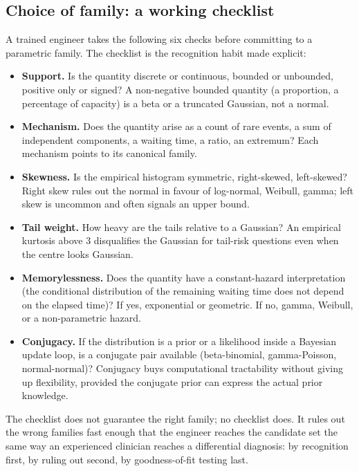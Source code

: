 

\subsection{Choice of family: a working checklist}

A trained engineer takes the following six checks before committing
to a parametric family. The checklist is the recognition habit made
explicit:

\begin{itemize}[leftmargin=*]
  \item \textbf{Support.} Is the quantity discrete or continuous,
    bounded or unbounded, positive only or signed? A non-negative
    bounded quantity (a proportion, a percentage of capacity) is a
    beta or a truncated Gaussian, not a normal.
  \item \textbf{Mechanism.} Does the quantity arise as a count of
    rare events, a sum of independent components, a waiting time, a
    ratio, an extremum? Each mechanism points to its canonical
    family.
  \item \textbf{Skewness.} Is the empirical histogram symmetric,
    right-skewed, left-skewed? Right skew rules out the normal in
    favour of log-normal, Weibull, gamma; left skew is uncommon and
    often signals an upper bound.
  \item \textbf{Tail weight.} How heavy are the tails relative to a
    Gaussian? An empirical kurtosis above $3$ disqualifies the
    Gaussian for tail-risk questions even when the centre looks
    Gaussian.
  \item \textbf{Memorylessness.} Does the quantity have a
    constant-hazard interpretation (the conditional distribution of
    the remaining waiting time does not depend on the elapsed time)?
    If yes, exponential or geometric. If no, gamma, Weibull, or a
    non-parametric hazard.
  \item \textbf{Conjugacy.} If the distribution is a prior or a
    likelihood inside a Bayesian update loop, is a conjugate pair
    available (beta-binomial, gamma-Poisson, normal-normal)?
    Conjugacy buys computational tractability without giving up
    flexibility, provided the conjugate prior can express the actual
    prior knowledge.
\end{itemize}

The checklist does not guarantee the right family; no checklist does.
It rules out the wrong families fast enough that the engineer reaches
the candidate set the same way an experienced clinician reaches a
differential diagnosis: by recognition first, by ruling out second,
by goodness-of-fit testing last.

